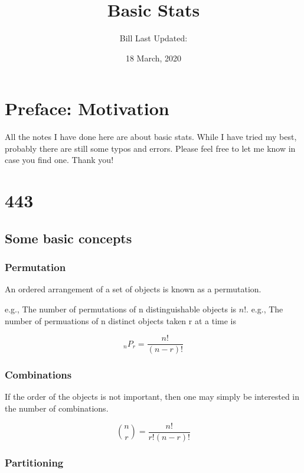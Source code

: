 \documentclass[
]{book}
\title{Basic Stats}
\author{Bill Last Updated:}
\date{18 March, 2020}
\begin{document}
\frontmatter
\maketitle

{
\setcounter{tocdepth}{1}
\tableofcontents
}
\mainmatter
\hypertarget{my-section}{%
\chapter*{Preface: Motivation}\label{my-section}}

All the notes I have done here are about basic stats. While I have tried my best, probably there are still some typos and errors. Please feel free to let me know in case you find one. Thank you!

\hypertarget{section}{%
\chapter{443}\label{section}}

\hypertarget{some-basic-concepts}{%
\section{Some basic concepts}\label{some-basic-concepts}}

\hypertarget{permutation}{%
\subsection{Permutation}\label{permutation}}

An ordered arrangement of a set of objects is known as a permutation.

e.g., The number of permutations of n distinguishable objects is \(n!\).
e.g., The number of permuations of n distinct objects taken r at a time is

\[_{n}P_r=\frac{n!}{(n-r)!}\]

\hypertarget{combinations}{%
\subsection{Combinations}\label{combinations}}

If the order of the objects is not important, then one may simply be interested in the number of combinations.

\[\binom{n}{r}=\frac{n!}{r!(n-r)!}\]

\hypertarget{partitioning}{%
\subsection{Partitioning}\label{partitioning}}
\end{document}

